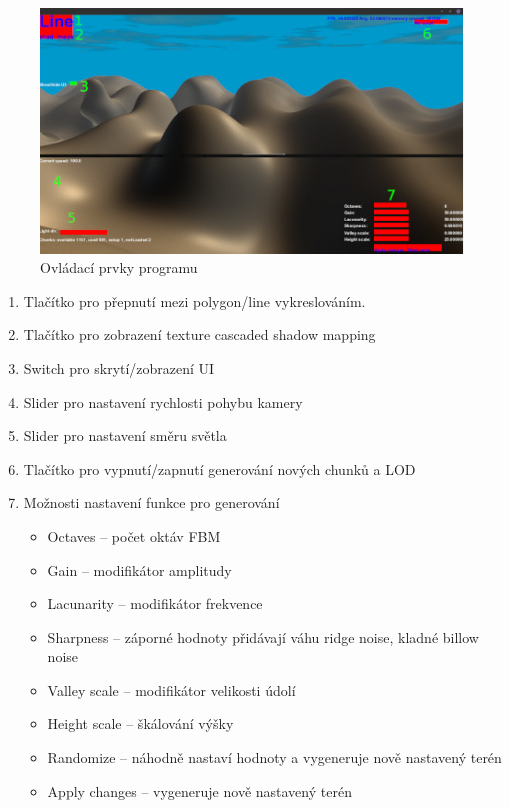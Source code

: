 \documentclass[12pt,a4paper,titlepage,final]{report}
\begin{document}
\begin{figure}[H]
    \centering
    \includegraphics[scale=0.75]{images/controls.jpg}
    \caption{Ovládací prvky programu}
    \label{fig:controls}
\end{figure}

\begin{enumerate}
    \item Tlačítko pro přepnutí mezi polygon/line vykreslováním.
    \item Tlačítko pro zobrazení texture cascaded shadow mapping
    \item Switch pro skrytí/zobrazení UI
    \item Slider pro nastavení rychlosti pohybu kamery
    \item Slider pro nastavení směru světla
    \item Tlačítko pro vypnutí/zapnutí generování nových chunků a LOD
    \item Možnosti nastavení funkce pro generování
    \begin{itemize}
        \item Octaves -- počet oktáv FBM
        \item Gain -- modifikátor amplitudy
        \item Lacunarity -- modifikátor frekvence
        \item Sharpness -- záporné hodnoty přidávají váhu ridge noise, kladné billow noise
        \item Valley scale -- modifikátor velikosti údolí
        \item Height scale -- škálování výšky
        \item Randomize -- náhodně nastaví hodnoty a vygeneruje nově nastavený terén
        \item Apply changes -- vygeneruje nově nastavený terén
    \end{itemize}
\end{enumerate}
\end{document}
